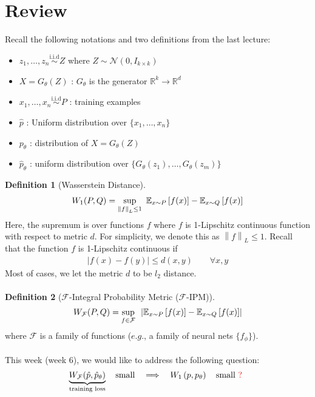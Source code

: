\documentclass[11pt]{article}
\newcommand\bbR{\ensuremath{\mathbb{R}}} %
\newcommand\bbE{\ensuremath{\mathbb{E}}} %
\newcommand{\norm}[1]{\left\lVert #1 \right\rVert} %
\newcommand{\abs}[1]{\left\lvert #1 \right\rvert} %
\newcommand{\1}{\mathbb{I}} %
\begin{document}
\section{Review}
Recall the following notations and two definitions from the last lecture:
\begin{itemize}
    \item[] $z_1,\ldots,z_n \overset{\text{i.i.d}}{\sim} Z$ where $Z \sim \mathcal{N}(0, I_{k \times k})$
    \item[] $X = G_{\theta}(Z)$ : $G_\theta$ is the generator $\bbR^k \rightarrow \bbR^d$ 
    \item[] $x_1, \ldots, x_n \overset{\text{i.i.d}}{\sim} P$ : training examples
    \item[] $\hat p$ : Uniform distribution over $\{x_1,\ldots, x_n\}$
    \item[] $p_\theta$ : distribution of $X = G_\theta (Z)$
    \item[] $\hat p_\theta$ : uniform distribution over $\{G_\theta (z_1), \ldots, G_\theta (z_m) \textbf{}\}$\\
\end{itemize}
\textbf{Definition 1} (Wasserstein Distance).
\begin{align*}
    W_1(P,Q) = \underset{\norm{f}_L \le 1}{\sup}  \hspace{0.5em}  \bbE_{x \sim P} \left[f(x) \right] - \bbE_{x \sim Q} \left[ f(x) \right]
\end{align*}
Here, the supremum is over functions $f$ where $f$ is 1-Lipschitz continuous function with respect to metric $d$. For simplicity, we denote this as $\norm{f}_L \le 1$. Recall that the function $f$ is 1-Lipschitz continuous if
\begin{align*}
    \abs{f(x) - f(y)} \le d(x,y) \qquad \forall x,y
\end{align*}
Most of cases, we let the metric $d$ to be $l_2$ distance.\\
\\
\textbf{Definition 2} ($\mathcal{F}$-Integral Probability Metric ($\mathcal{F}$-IPM)).
\begin{align*}
    W_\mathcal{F}(P,Q) = \underset{f \in \mathcal{F}}{\sup}  \hspace{0.5em}  \abs{ \bbE_{x \sim P} \left[f(x) \right] - \bbE_{x \sim Q} \left[ f(x) \right] }
\end{align*}
where $\mathcal{F}$ is a family of functions ($e.g.$, a family of neural nets $\{f_\phi\}$). \\
\\
This week (week 6), we would like to address the following question: 
\begin{align*}
    \underbrace{W_\mathcal{F} (\hat p, \hat p_\theta )}_{\text{training loss}} \quad \text{small} \quad  \Longrightarrow \quad W_1 \left( p, p_\theta \right) \quad \text{small} \textcolor{red}{ \text{ ? }}
\end{align*}
\end{document}
